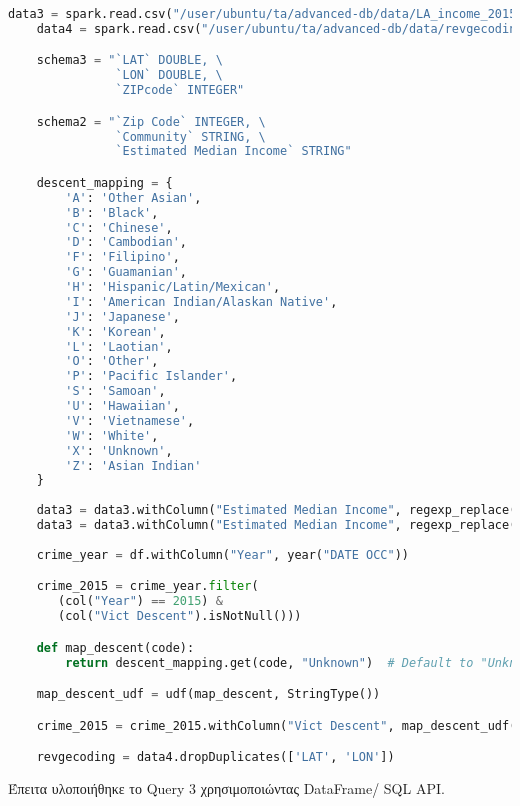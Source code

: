 \documentclass{article}
\begin{document}
\begin{lstlisting}[language = Python]
    data3 = spark.read.csv("/user/ubuntu/ta/advanced-db/data/LA_income_2015.csv", header=True, schema=schema2)
    data4 = spark.read.csv("/user/ubuntu/ta/advanced-db/data/revgecoding.csv", header=True, schema=schema3)

    schema3 = "`LAT` DOUBLE, \
               `LON` DOUBLE, \
               `ZIPcode` INTEGER"

    schema2 = "`Zip Code` INTEGER, \
	           `Community` STRING, \
	           `Estimated Median Income` STRING"

    descent_mapping = {
        'A': 'Other Asian',
        'B': 'Black',
        'C': 'Chinese',
        'D': 'Cambodian',
        'F': 'Filipino',
        'G': 'Guamanian',
        'H': 'Hispanic/Latin/Mexican',
        'I': 'American Indian/Alaskan Native',
        'J': 'Japanese',
        'K': 'Korean',
        'L': 'Laotian',
        'O': 'Other',
        'P': 'Pacific Islander',
        'S': 'Samoan',
        'U': 'Hawaiian',
        'V': 'Vietnamese',
        'W': 'White',
        'X': 'Unknown',
        'Z': 'Asian Indian'
    }
    
    data3 = data3.withColumn("Estimated Median Income", regexp_replace(col("Estimated Median Income"), "\$", ""))
    data3 = data3.withColumn("Estimated Median Income", regexp_replace(col("Estimated Median Income"), ",", "").cast("float"))
     
    crime_year = df.withColumn("Year", year("DATE OCC"))

    crime_2015 = crime_year.filter(
       (col("Year") == 2015) & 
       (col("Vict Descent").isNotNull()))

    def map_descent(code):
        return descent_mapping.get(code, "Unknown")  # Default to "Unknown" if code not found

    map_descent_udf = udf(map_descent, StringType())

    crime_2015 = crime_2015.withColumn("Vict Descent", map_descent_udf(crime_2015["Vict Descent"]))

    revgecoding = data4.dropDuplicates(['LAT', 'LON'])
\end{lstlisting}

Έπειτα υλοποιήθηκε το Query 3 χρησιμοποιώντας DataFrame/ SQL API. 
\end{document}
